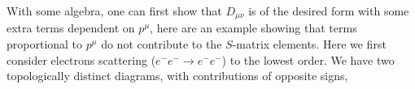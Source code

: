 \documentclass[11pt, onesided]{book}
\theoremstyle{break}
\theoremstyle{break}
\begin{document}
%
%
With some algebra, one can first show that $D_{\mu\nu}$ is of the desired form with some extra terms dependent on $p^\mu$, here are an example showing that terms proportional to $p^\mu$ do not contribute to the $S$-matrix elements. Here we first consider electrons scattering ($e^-e^-\to e^-e^-$) to the lowest order. We have two topologically distinct diagrams, with contributions of opposite signs,\\
\end{document}

